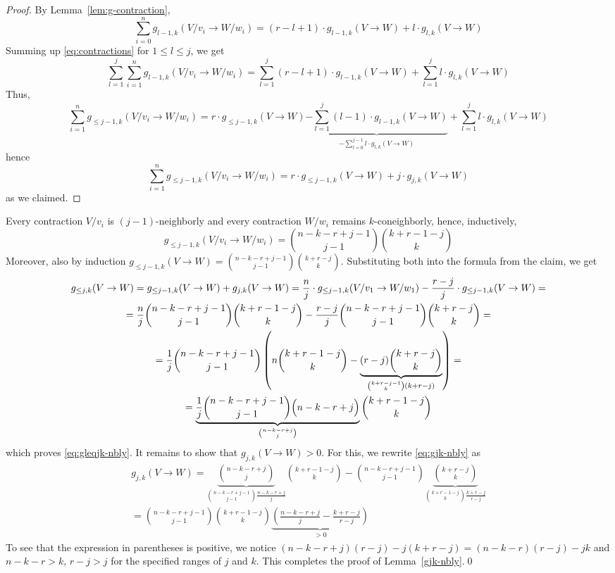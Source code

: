 \begin{proof}
By Lemma~\ref{lem:g-contraction},
\begin{equation}
\label{eq:contractions}
\sum_{i=0}^n g_{l-1,k}(V/v_i\to W/w_i) = (r-l+1) \cdot g_{l-1,k}(V\to W) + l \cdot g_{l,k}(V\to W)
\end{equation}
Summing up \eqref{eq:contractions} for $1 \leq l \leq j$, we get
\[ \sum_{l=1}^j \sum_{i=1}^n g_{l-1,k}(V/v_i\to W/w_i) = \sum_{l=1}^j (r-l+1) \cdot g_{l-1,k}(V\to W) + \sum_{l=1}^j l \cdot g_{l,k}(V \to W) \]
Thus,
\[ \sum_{i=1}^n g_{\leq j-1, k}(V/v_i\to W/w_i) = r \cdot g_{\leq j-1, k}(V \to W) \underbrace{ - \sum_{l=1}^j (l-1) \cdot g_{l-1,k}(V \to W)}_{-\sum_{l=0}^{j-1} l \cdot g_{l,k}(V \to W)} + \sum_{l=1}^j l \cdot g_{l,k}(V \to W)\]
hence
\begin{equation}
\label{eq:}
\sum_{i=1}^n g_{\leq j-1, k}(V/v_i\to W/w_i) = r \cdot g_{\leq j-1, k}(V \to W) + j \cdot g_{j,k}(V \to W)
\end{equation}
as we claimed.
\end{proof}
Every contraction $V/v_i$ is $(j-1)$-neighborly and every contraction $W/w_i$ remains $k$-coneighborly, hence, inductively,
\[ g_{\leq j-1, k} (V/v_i\to W/w_i) = \binom{n-k-r+j-1}{j-1} \binom{k+r-1-j}{k} \]
Moreover, also by induction $g_{\leq j-1, k}(V \to W) = \binom{n-k-r+j-1}{j-1} \binom{k+r-j}{k}$.
%
Substituting both into the formula from the claim, we get
\begin{multline}
g_{\leq j,k} (V \to W) = g_{\leq j-1,k} (V \to W) + g_{j,k}(V \to W) = \dfrac{n}{j} \cdot g_{\leq j-1,k} (V/v_1 \to W/w_1) - \dfrac{r-j}{j} \cdot g_{\leq j-1,k} (V \to W) = \\
= \dfrac{n}{j} \binom{n-k-r+j-1}{j-1} \binom{k+r-1-j}{k} - \frac{r-j}{j} \binom{n-k-r+j-1}{j-1} \binom{k+r-j}{k} = \\
= \dfrac{1}{j} \binom{n-k-r+j-1}{j-1} \left( n \binom{k+r-1-j}{k} - \underbrace{(r-j)\binom{k+r-j}{k}}_{\binom{k+r-j-1}{k}(k+r-j)} \right) = \\
= \underbrace{\dfrac{1}{j} \binom{n-k-r+j-1}{j-1} \Bigl( n-k-r+j \Bigr)}_{\binom{n-k-r+j}{j}}\binom{k+r-1-j}{k}
\end{multline}
which proves \eqref{eq:gleqjk-nbly}.
%
It remains to show that $g_{j,k}(V \to W) > 0$. For this, we rewrite \eqref{eq:gjk-nbly} as
%
\begin{multline}
g_{j,k}(V \to W)=\underbrace{\binom{n-k-r+j}{j}}_{\binom{n-k-r+j-1}{j-1} \frac{n-k-r+j}{j}}\binom{k+r-1-j}{k} - \binom{n-k-r+j-1}{j-1} \underbrace{\binom{k+r-j}{k}}_{\binom{k+r-1-j}{k} \frac{k+r-j}{r-j}}  \\
= \binom{n-k-r+j-1}{j-1} \binom{k+r-1-j}{k} \underbrace{ \left( \frac{n-k-r+j}{j} - \frac{k+r-j}{r-j} \right)}_{>0}
\end{multline}
%
To see that the expression in parentheses is positive, we notice $(n-k-r+j)(r-j) - j (k+r-j) = (n-k-r)(r-j)-jk$ and $n-k-r > k$, $r-j > j$ for the specified ranges of $j$ and $k$.
This completes the proof of Lemma~\ref{gjk-nbly}.\qed
%
